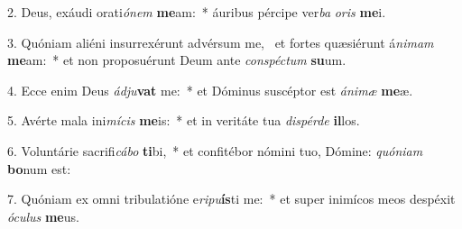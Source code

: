 2. Deus, exáudi orati\textit{ó}\textit{nem} \textbf{me}am:~*  áuribus pércipe ver\textit{ba} \textit{o}\textit{ris} \textbf{me}i.\

3. Quóniam aliéni insurrexérunt advérsum me, \dag\  et fortes quæsiérunt á\textit{ni}\textit{mam} \textbf{me}am:~*  et non proposuérunt Deum ante \textit{con}\textit{spéc}\textit{tum} \textbf{su}um.\

4. Ecce enim Deus \textit{ád}\textit{ju}\textbf{vat} me:~*  et Dóminus suscéptor est \textit{á}\textit{ni}\textit{mæ} \textbf{me}æ.\

5. Avérte mala ini\textit{mí}\textit{cis} \textbf{me}is:~*  et in veritáte tua \textit{dis}\textit{pér}\textit{de} \textbf{il}los.\

6. Voluntárie sacrifi\textit{cá}\textit{bo} \textbf{ti}bi,~*  et confitébor nómini tuo, Dómine: \textit{quón}\textit{i}\textit{am} \textbf{bo}num est:\

7. Quóniam ex omni tribulatióne e\textit{ri}\textit{pu}\textbf{ís}ti me:~*  et super inimícos meos despéxit \textit{ó}\textit{cu}\textit{lus} \textbf{me}us.\

